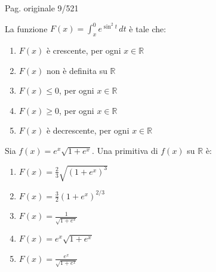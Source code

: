 \par\noindent\hfill{\color{cyan!65!black}\scriptsize Pag. originale 9/521}\par\smallskip
\begin{quiz}
La funzione $F(x)=\displaystyle\int_x^0 e^{\sin^2 t}\,dt$ \`e tale che:
\begin{enumerate}[label=\alph*),leftmargin=1.3cm,itemsep=3pt,topsep=5pt]\item $F(x)$ \`e crescente, per ogni $x\in\mathbb R$\item $F(x)$ non \`e definita su $\mathbb R$\item $F(x)\le0$, per ogni $x\in\mathbb R$\item $F(x)\ge0$, per ogni $x\in\mathbb R$\item $F(x)$ \`e decrescente, per ogni $x\in\mathbb R$\end{enumerate}
\end{quiz}

\begin{quiz}
Sia $f(x)=e^x\sqrt{1+e^x}$. Una primitiva di $f(x)$ su $\mathbb R$ \`e:
\begin{enumerate}[label=\alph*),leftmargin=1.3cm,itemsep=3pt,topsep=5pt]\item $F(x)=\frac23\sqrt{(1+e^x)^3}$\item $F(x)=\frac32(1+e^x)^{2/3}$\item $F(x)=\frac1{\sqrt{1+e^x}}$\item $F(x)=e^x\sqrt{1+e^x}$\item $F(x)=\frac{e^x}{\sqrt{1+e^x}}$\end{enumerate}
\end{quiz}

